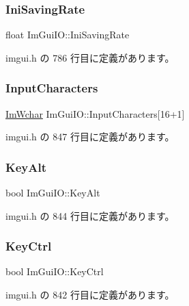 \subsubsection{\texorpdfstring{Ini\+Saving\+Rate}{IniSavingRate}}
{\footnotesize\ttfamily float Im\+Gui\+I\+O\+::\+Ini\+Saving\+Rate}



 imgui.\+h の 786 行目に定義があります。

\mbox{\label{struct_im_gui_i_o_af6283418a2bff9db1522a6245476c7ed}} 
\subsubsection{\texorpdfstring{Input\+Characters}{InputCharacters}}
{\footnotesize\ttfamily \mbox{\hyperlink{imgui_8h_af2c7badaf05a0008e15ef76d40875e97}{Im\+Wchar}} Im\+Gui\+I\+O\+::\+Input\+Characters\mbox{[}16+1\mbox{]}}



 imgui.\+h の 847 行目に定義があります。

\mbox{\label{struct_im_gui_i_o_a1e64ef08a4448a2cac874496130992cb}} 
\subsubsection{\texorpdfstring{Key\+Alt}{KeyAlt}}
{\footnotesize\ttfamily bool Im\+Gui\+I\+O\+::\+Key\+Alt}



 imgui.\+h の 844 行目に定義があります。

\mbox{\label{struct_im_gui_i_o_a51de8f65dcabb80ef4e0d3c759ffcd7f}} 
\subsubsection{\texorpdfstring{Key\+Ctrl}{KeyCtrl}}
{\footnotesize\ttfamily bool Im\+Gui\+I\+O\+::\+Key\+Ctrl}



 imgui.\+h の 842 行目に定義があります。

